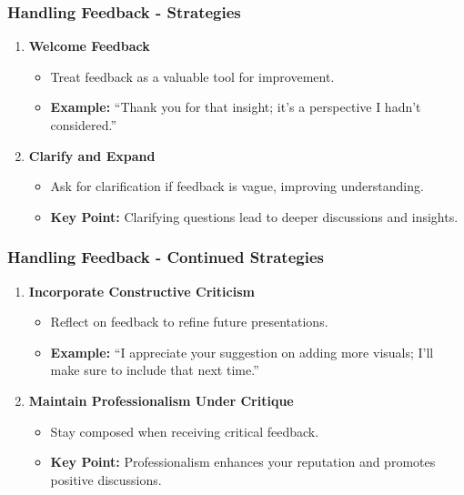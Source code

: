 \documentclass[aspectratio=169]{beamer}
\begin{document}
\begin{frame}[fragile]
    \frametitle{Handling Feedback - Strategies}
    \begin{enumerate}
        \item \textbf{Welcome Feedback}
            \begin{itemize}
                \item Treat feedback as a valuable tool for improvement. 
                \item \textbf{Example:} “Thank you for that insight; it’s a perspective I hadn’t considered.”
            \end{itemize}

        \item \textbf{Clarify and Expand}
            \begin{itemize}
                \item Ask for clarification if feedback is vague, improving understanding.
                \item \textbf{Key Point:} Clarifying questions lead to deeper discussions and insights.
            \end{itemize}
    \end{enumerate}
\end{frame}

\begin{frame}[fragile]
    \frametitle{Handling Feedback - Continued Strategies}
    \begin{enumerate}[resume]
        \item \textbf{Incorporate Constructive Criticism}
            \begin{itemize}
                \item Reflect on feedback to refine future presentations.
                \item \textbf{Example:} “I appreciate your suggestion on adding more visuals; I’ll make sure to include that next time.”
            \end{itemize}

        \item \textbf{Maintain Professionalism Under Critique}
            \begin{itemize}
                \item Stay composed when receiving critical feedback.
                \item \textbf{Key Point:} Professionalism enhances your reputation and promotes positive discussions.
            \end{itemize}
    \end{enumerate}
\end{frame}
\end{document}
